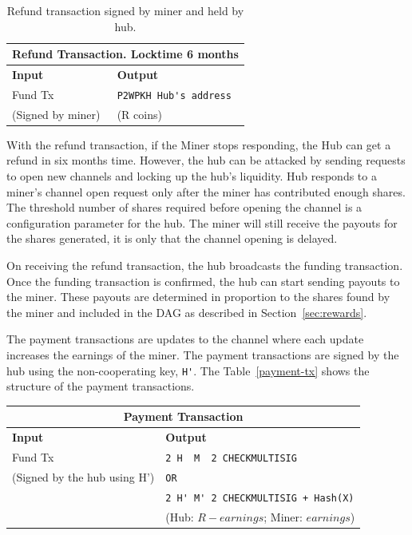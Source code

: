 \documentclass{article}
\begin{document}
\begin{table}
  \centering
  \begin{tabular}{ ll }
    \multicolumn{2}{c}{\bfseries Refund Transaction. Locktime 6 months} \\
    \midrule
    \bfseries Input & \bfseries Output \\
    \midrule
    Fund Tx & \verb|P2WPKH Hub's address| \\
    (Signed by miner) & (R coins) \\
    \midrule
  \end{tabular}
  \caption{Refund transaction signed by miner and held by
    hub.}\label{refund-tx}
\end{table}

With the refund transaction, if the Miner stops responding, the Hub
can get a refund in six months time. However, the hub can be attacked
by sending requests to open new channels and locking up the hub's
liquidity. Hub responds to a miner's channel open request only after
the miner has contributed enough shares. The threshold number of
shares required before opening the channel is a configuration
parameter for the hub. The miner will still receive the payouts for
the shares generated, it is only that the channel opening is delayed.

On receiving the refund transaction, the hub broadcasts the funding
transaction. Once the funding transaction is confirmed, the hub can
start sending payouts to the miner. These payouts are determined in
proportion to the shares found by the miner and included in the DAG as
described in Section~\ref{sec:rewards}.

The payment transactions are updates to the channel where each update
increases the earnings of the miner. The payment transactions are
signed by the hub using the non-cooperating key, \verb|H'|. The
Table~\ref{payment-tx} shows the structure of the payment
transactions.

\begin{center}
  \begin{tabular}{ ll }
    \multicolumn{2}{c}{\bfseries Payment Transaction} \\
    \midrule
    \bfseries Input & \bfseries Output \\
    \midrule
    Fund Tx & \verb|2 H  M  2 CHECKMULTISIG| \\
    (Signed by the hub using H') & \verb|OR| \\
                    & \verb|2 H' M' 2 CHECKMULTISIG + Hash(X)| \\
                    & (Hub: $R - earnings$; Miner: $earnings$) \\
    \midrule
  \end{tabular}
\end{center}
\end{document}
